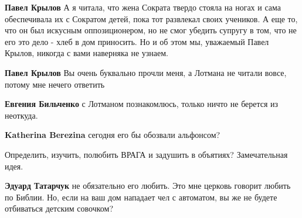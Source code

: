 \begin{itemize}
\begin{itemize}
\textbf{Павел Крылов} А я читала, что жена Сократа твердо стояла на ногах и
сама обеспечивала их с Сократом детей, пока тот развлекал своих учеников. А еще
то, что он был искусным оппозиционером, но не смог убедить супругу в том, что
не его это дело - хлеб в дом приносить. Но и об этом мы, уважаемый Павел
Крылов, никогда с вами наверняка не узнаем.

 
\textbf{Павел Крылов} Вы очень буквально прочли меня, а Лотмана не читали вовсе, потому мне нечего ответить

 
\textbf{Евгения Бильченко}
с Лотманом познакомлюсь, только ничто не берется из неоткуда.

 
\textbf{Katherina Berezina}
сегодня его бы обозвали альфонсом?
\end{itemize}

 
Определить, изучить, полюбить ВРАГА и задушить в объятиях? Замечательная идея.

\begin{itemize}
 
\textbf{Эдуард Татарчук} не обязательно его любить. Это мне церковь говорит любить по Библии. Но, если на ваш дом нападает чел с автоматом, вы же не будете отбиваться детским совочком?


\end{itemize}
\end{itemize}
